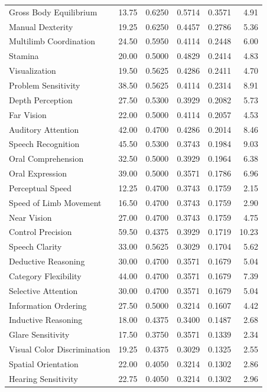 \begin{longtable}{lrrrrr}
Gross Body Equilibrium & 13.75 & 0.6250 & 0.5714 & 0.3571 & 4.91 \\
Manual Dexterity & 19.25 & 0.6250 & 0.4457 & 0.2786 & 5.36 \\
Multilimb Coordination & 24.50 & 0.5950 & 0.4114 & 0.2448 & 6.00 \\
Stamina & 20.00 & 0.5000 & 0.4829 & 0.2414 & 4.83 \\
Visualization & 19.50 & 0.5625 & 0.4286 & 0.2411 & 4.70 \\
Problem Sensitivity & 38.50 & 0.5625 & 0.4114 & 0.2314 & 8.91 \\
Depth Perception & 27.50 & 0.5300 & 0.3929 & 0.2082 & 5.73 \\
Far Vision & 22.00 & 0.5000 & 0.4114 & 0.2057 & 4.53 \\
Auditory Attention & 42.00 & 0.4700 & 0.4286 & 0.2014 & 8.46 \\
Speech Recognition & 45.50 & 0.5300 & 0.3743 & 0.1984 & 9.03 \\
Oral Comprehension & 32.50 & 0.5000 & 0.3929 & 0.1964 & 6.38 \\
Oral Expression & 39.00 & 0.5000 & 0.3571 & 0.1786 & 6.96 \\
Perceptual Speed & 12.25 & 0.4700 & 0.3743 & 0.1759 & 2.15 \\
Speed of Limb Movement & 16.50 & 0.4700 & 0.3743 & 0.1759 & 2.90 \\
Near Vision & 27.00 & 0.4700 & 0.3743 & 0.1759 & 4.75 \\
Control Precision & 59.50 & 0.4375 & 0.3929 & 0.1719 & 10.23 \\
Speech Clarity & 33.00 & 0.5625 & 0.3029 & 0.1704 & 5.62 \\
Deductive Reasoning & 30.00 & 0.4700 & 0.3571 & 0.1679 & 5.04 \\
Category Flexibility & 44.00 & 0.4700 & 0.3571 & 0.1679 & 7.39 \\
Selective Attention & 30.00 & 0.4700 & 0.3571 & 0.1679 & 5.04 \\
Information Ordering & 27.50 & 0.5000 & 0.3214 & 0.1607 & 4.42 \\
Inductive Reasoning & 18.00 & 0.4375 & 0.3400 & 0.1487 & 2.68 \\
Glare Sensitivity & 17.50 & 0.3750 & 0.3571 & 0.1339 & 2.34 \\
Visual Color Discrimination & 19.25 & 0.4375 & 0.3029 & 0.1325 & 2.55 \\
Spatial Orientation & 22.00 & 0.4050 & 0.3214 & 0.1302 & 2.86 \\
Hearing Sensitivity & 22.75 & 0.4050 & 0.3214 & 0.1302 & 2.96 \\

\end{longtable}
